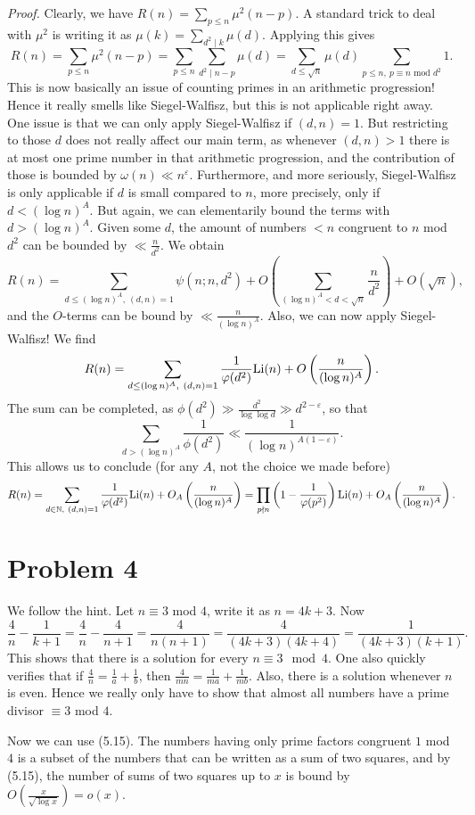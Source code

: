 \documentclass[a4paper,11pt]{article}
\begin{document}
\textit{Proof.} Clearly, we have $R(n) = \sum_{p \leq n} \mu^2(n-p)$. A standard 
trick to deal with $\mu^2$ is writing it as $\mu(k) = \sum_{d^2 \mid k} \mu(d)$.
Applying this gives
\[
    R(n) = \sum_{p \leq n} \mu^2(n-p) = \sum_{p \leq n} \sum_{d^2 \mid n-p} \mu(d)
    = \sum_{d \leq \sqrt n} \mu(d) \sum_{p \leq n, \ p \equiv n \text{ mod } d^2} 1.
\]
This is now basically an issue of counting primes in an arithmetic progression! 
Hence it really smells like Siegel-Walfisz, but this is not applicable right away. 
One issue is that we can only apply Siegel-Walfisz if $(d,n)=1$. But restricting to those
$d$ does not really affect our main term, as whenever $(d,n)>1$ there is at
most one prime number in that arithmetic progression, and the contribution of
those is bounded by $\omega(n) \ll n^{\varepsilon}$. Furthermore, and more
seriously, Siegel-Walfisz is only applicable if $d$ is small compared to $n$,
more precisely, only if $d < (\log n)^A$.  But again, we can elementarily bound
the terms with $d > (\log n)^A$. Given some $d$, the amount of numbers $<n$
congruent to $n$ mod $d^2$ can be bounded by $\ll \frac n {d^2}$. We obtain
\[
    R(n) = \sum_{d \leq (\log n)^A, \ (d,n)=1} \psi(n; n, d^2) + 
    O\left(\sum_{(\log n)^A < d < \sqrt n} \frac{n}{d^2} \right) + O(\sqrt n),
\]
and the $O$-terms can be bound by $\ll \frac{n}{(\log n)^A}$. Also, we can now apply
Siegel-Walfisz! We find
\[
    R(n) = \sum_{d \leq (\log n)^A, \ (d,n)=1} \frac{1}{\varphi(d^2)} \mathrm{Li}(n) 
    + O\left( \frac{n}{(\log n)^A} \right).
\]
The sum can be completed, as $\phi(d^2) \gg \frac {d^2}{\log \log d} \gg
d^{2-\varepsilon}$, so that 
\[
    \sum_{d > (\log n)^A} \frac 1{\phi(d^2)} \ll \frac{1}{(\log n)^{A(1-\varepsilon)}}.
\]
This allows us to conclude (for any $A$, not the choice we made before)
\[
    R(n) = \sum_{d \in \mathbb{N}, \ (d,n) = 1} \frac 1 {\varphi(d^2)} \mathrm{Li}(n)
    + O_A\left( \frac{n}{(\log n)^A} \right) = \prod_{p \nmid n}\left(1-\frac
    1{\varphi(p^2)}\right) \mathrm{Li}(n) + O_A\left( \frac{n}{(\log n)^A} \right).
\]




\section*{Problem 4}
We follow the hint.
Let $n \equiv 3$ mod $4$, write it as $n = 4k+3$. Now
\[
     \frac 4n - \frac 1{k+1} = \frac 4n-\frac 4{n+1} =
    \frac{4}{n(n+1)} = \frac 4{(4k+3)(4k+4)} = \frac 1{(4k+3)(k+1)}.
\]
This shows that there is a solution for every $n \equiv 3 \mod 4$. 
One also quickly verifies that if $\frac 4n = \frac 1a + \frac 1b$,
then $\frac 4{mn} = \frac 1{ma}+ \frac 1{mb}$. Also, there is a 
solution whenever $n$ is even. Hence we really only
have to show that almost all numbers have a prime divisor $\equiv 3$ mod $4$.

Now we can use (5.15). The numbers having only prime factors congruent
$1$ mod $4$ is a subset of the numbers that can be written as a sum of 
two squares, and by (5.15), the number of sums of two squares up to $x$ is bound by
$O(\frac x{\sqrt{\log x}}) = o(x)$.


\contactend
\end{document}

